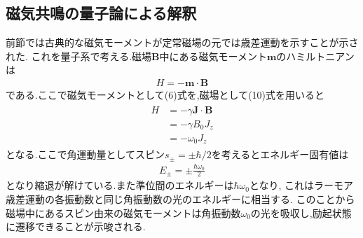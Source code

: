 \subsection{磁気共鳴の量子論による解釈}
前節では古典的な磁気モーメントが定常磁場の元では歳差運動を示すことが示された.
これを量子系で考える.磁場${\bm B}$中にある磁気モーメント${\bm m}$のハミルトニアンは
\begin{align}
  H=-{\bm m}\cdot{\bm B}
\end{align}
である.ここで磁気モーメントとして(6)式を,磁場として(10)式を用いると
\begin{align}
  \begin{split}
    H&=-\gamma {\bm J}\cdot{\bm B}\\
    &=-\gamma B_0J_z\\
    &=-\omega_0 J_z
  \end{split}
\end{align}
となる.ここで角運動量としてスピン$s_{\pm}=\pm\hbar/2$を考えるとエネルギー固有値は
\begin{align}
  E_{\pm}=\pm\frac{\hbar\omega_0}{2}
\end{align}
となり縮退が解けている.また準位間のエネルギーは$\hbar\omega_0$となり,
これはラーモア歳差運動の各振動数と同じ角振動数の光のエネルギーに相当する.
このことから磁場中にあるスピン由来の磁気モーメントは角振動数$\omega_0$の光を吸収し,励起状態に遷移できることが示唆される.
